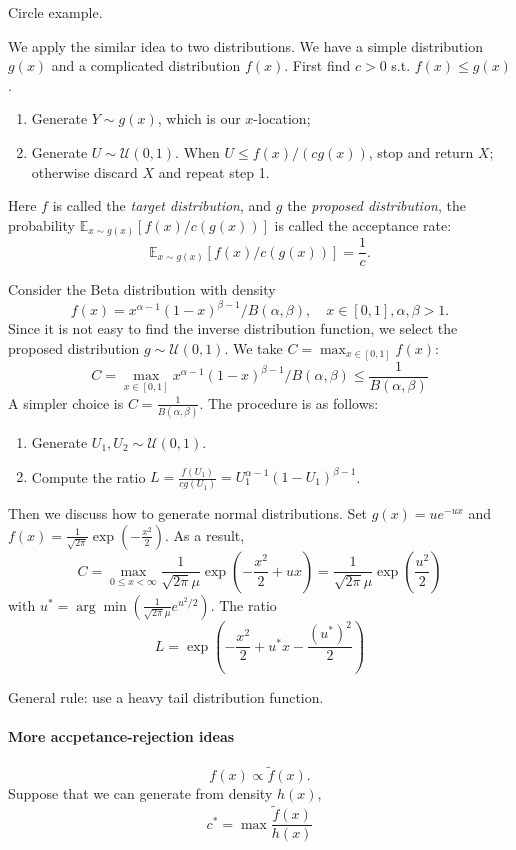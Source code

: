 Circle example.

We apply the similar idea to two distributions.
We have a simple distribution $g(x)$ and a complicated distribution $f(x)$.
First find $c>0$ s.t. $f(x)\le g(x)$.
\begin{enumerate}
\item
Generate $Y\sim g(x)$, which is our $x$-location;
\item
Generate $U\sim\mathcal{U}(0,1)$.
When $U\le f(x)/(cg(x))$, stop and return $X$;
otherwise discard $X$ and repeat step 1.
\end{enumerate}

Here $f$ is called the \emph{target distribution}, and $g$ the \emph{proposed distribution}, the probability $\mathbb{E}_{x\sim g(x)}[f(x)/c(g(x))]$ is called the acceptance rate:
\[
\mathbb{E}_{x\sim g(x)}[f(x)/c(g(x))] = \frac{1}{c}.
\]
\begin{example}
Consider the Beta distribution with density
\[
f(x) = x^{\alpha  - 1} (1-x)^{\beta - 1}/B(\alpha,\beta),\quad
x\in[0,1],\alpha,\beta>1.
\]
Since it is not easy to find the inverse distribution function, we select the proposed distribution $g\sim\mathcal{U}(0,1)$.
We take $C = \max_{x\in[0,1]}f(x)$:
\[
C = \max_{x\in[0,1]}
x^{\alpha  - 1} (1-x)^{\beta - 1}/B(\alpha,\beta)
\le
\frac{1}{B(\alpha,\beta)}
\]
A simpler choice is $C = \frac{1}{B(\alpha,\beta)}$.
The procedure is as follows:
\begin{enumerate}
\item
Generate $U_1,U_2\sim\mathcal{U}(0,1)$.
\item
Compute the ratio $L =\frac{f(U_1)}{cg(U_1)} = U_1^{\alpha  - 1} (1-U_1)^{\beta - 1}$.
\end{enumerate}
\end{example}

\begin{example}
Then we discuss how to generate normal distributions.
Set $g(x) = ue^{-ux}$ and $f(x) = \frac{1}{\sqrt{2\pi}}\exp\left(-\frac{x^2}{2}\right)$.
As a result,
\[
C = \max_{0\le x<\infty}\frac{1}{\sqrt{2\pi}\mu}\exp\left(
-\frac{x^2}{2} + ux
\right)
=
\frac{1}{\sqrt{2\pi}\mu}\exp\left(
\frac{u^2}{2}
\right)
\]
with $u^* = \arg\min(\frac{1}{\sqrt{2\pi}\mu} e^{u^2/2})$.
The ratio
\[
L=\exp\left(
-\frac{x^2}{2} + u^*x - \frac{(u^*)^2}{2}
\right)
\]

\end{example}
General rule: use a heavy tail distribution function.

\paragraph{More accpetance-rejection ideas}
\[
f(x)\propto \tilde{f}(x).
\]
Suppose that we can generate from density $h(x)$,
\[
c^* = \max\frac{\tilde{f}(x)}{h(x)}
\]
